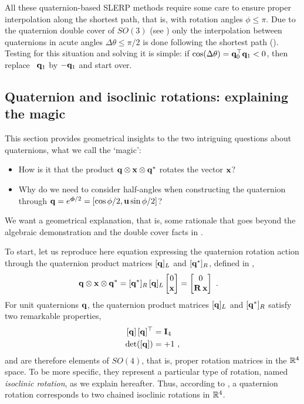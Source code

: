 All these quaternion-based SLERP methods require some care to ensure proper interpolation along the shortest path, that is, with rotation angles $\phi\leq\pi$. 
Due to the quaternion double cover of $SO(3)$ (see ) only the interpolation between quaternions in acute angles $\Delta\theta\leq\pi/2$ is done following the shortest path (). 
Testing for this situation and solving it is simple: if $\cos(\Delta\theta)={\bf q}_0^{\top}{\bf q}_1<0$, then replace \eg~${\bf q}_1$ by $-{\bf q}_1$ and start over.



\subsection{Quaternion and isoclinic rotations: explaining the magic}
\label{sec:isoclinic}

This section provides geometrical insights to the two intriguing questions about quaternions, what we call the `magic':
\begin{itemize}
\item
How is it that the product ${\bf q}\otimes{\bf x}\otimes{\bf q}^*$ rotates the vector ${\bf x}$? 
\item
Why do we need to consider half-angles when constructing the quaternion through ${\bf q}=e^{{\bm \phi}/2}=[\cos \phi/2 , {\bf u}\sin\phi/2]$?
\end{itemize}
%
We want a geometrical explanation, that is, some rationale that goes beyond the algebraic demonstration  and the double cover facts in .

To start, let us reproduce here equation  expressing the quaternion rotation action through the quaternion product matrices $[{\bf q}]_L$ and $[{\bf q}^*]_R$, defined in ,
%
\begin{align*}
{\bf q}\otimes
{\bf x}\otimes{\bf q}^*
&= [{\bf q}^*]_R\,[{\bf q}]_L\begin{bmatrix}
0 \\ {\bf x}
\end{bmatrix} 
= \begin{bmatrix}
0 \\ {\bf R}\,{\bf x}
\end{bmatrix} 
~.
\end{align*}
%
For unit quaternions ${\bf q}$, the quaternion product matrices $[{\bf q}]_L$ and $[{\bf q}^*]_R$ satisfy two remarkable properties,
%
%
\begin{align}
 [{\bf q}]\,[{\bf q}]^{\top} &= {\bf I}_4 \\
 \det([{\bf q}]) &= +1 
 ~, 
\end{align}%
%
and are therefore elements of $SO(4)$, that is, proper rotation matrices in the ${\mathbb R}^4$ space. 
To be more specific, they represent a particular type of rotation, named \emph{isoclinic rotation}, as we explain hereafter.
Thus, according to , a quaternion rotation corresponds to two chained isoclinic rotations in ${\mathbb R}^4$.

